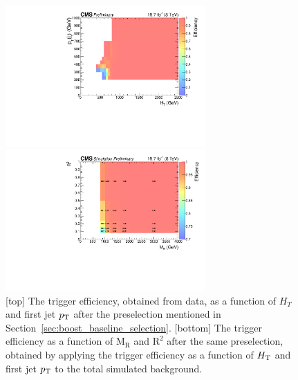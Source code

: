 \begin{figure}[htpb]
\centering
\includegraphics[width=0.68\textwidth]{figures/razor_trigger/h_HT_j1pt_pre_eff_ph_l}

\includegraphics[width=0.68\textwidth]{figures/razor_trigger/MR_R2_bg_trig_eff}
\caption{[top] The trigger efficiency, obtained from data, as a function of $H_T$ and first jet
$p_{\mathrm{T}}$ after the preselection mentioned in Section~\ref{sec:boost_baseline_selection}.
[bottom] The trigger efficiency as a function of $\mathrm{M_R}$ and $\mathrm{R^2}$ after the same
preselection, obtained by applying the trigger efficiency as a function of $H_{\mathrm{T}}$ and first jet $p_{\mathrm{T}}$
to the total simulated background. 
\label{fig:boost_trigger_efficiency}}
\end{figure}  

